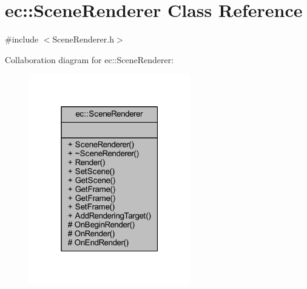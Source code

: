 \hypertarget{classec_1_1_scene_renderer}{}\section{ec\+:\+:Scene\+Renderer Class Reference}
\label{classec_1_1_scene_renderer}


{\ttfamily \#include $<$Scene\+Renderer.\+h$>$}



Collaboration diagram for ec\+:\+:Scene\+Renderer\+:\nopagebreak
\begin{figure}[H]
\begin{center}
\leavevmode
\includegraphics[width=199pt]{classec_1_1_scene_renderer__coll__graph}
\end{center}
\end{figure}
